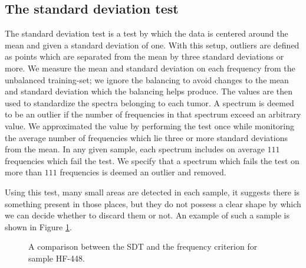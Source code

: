 \subsection{The standard deviation test}

The standard deviation test is a test by which the data is centered around the mean and given a standard deviation of one. With this setup, outliers are defined as points which are separated from the mean by three standard deviations or more. We measure the mean and standard deviation on each frequency from the unbalanced training-set; we ignore the balancing to avoid changes to the mean and standard deviation which the balancing helps produce. The values are then used to standardize the spectra belonging to each tumor. A spectrum is deemed to be an outlier if the number of frequencies in that spectrum exceed an arbitrary value. We approximated the value by performing the test once while monitoring the average number of frequencies which lie three or more standard deviations from the mean. In any given sample, each spectrum includes on average $111$ frequencies which fail the test. We specify that a spectrum which fails the test on more than $111$ frequencies is deemed an outlier and removed.

Using this test, many small areas are detected in each sample, it suggests there is something present in those places, but they do not possess a clear shape by which we can decide whether to discard them or not. An example of such a sample is shown in Figure \ref{fig:stdHF448}.

\begin{figure}[H]

    \centering
    \qquad
    \caption{A comparison between the SDT and the frequency criterion for sample HF-448.
\label{fig:stdHF448}}%
\end{figure}

